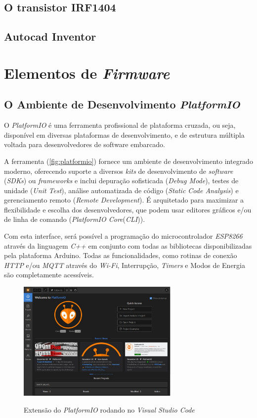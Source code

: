 \subsection{O transistor IRF1404} 
\subsection{Autocad Inventor}

\section{Elementos de \textit{Firmware}}

\subsection{O Ambiente de Desenvolvimento \textit{PlatformIO}}


O \textit{PlatformIO} é uma ferramenta profissional de plataforma cruzada, ou seja, disponível em diversas plataformas de desenvolvimento, e de estrutura múltipla voltada para desenvolvedores de software embarcado.

A ferramenta (\autoref{fig:platformio}) fornece um ambiente de desenvolvimento integrado moderno, oferecendo suporte a diversos \textit{kits} de desenvolvimento de \textit{software} (\textit{SDKs}) ou \textit{frameworks} e inclui depuração sofisticada (\textit{Debug Mode}), testes de unidade (\textit{Unit Test}), análise automatizada de código (\textit{Static Code Analysis}) e gerenciamento remoto (\textit{Remote Development}). É arquitetado para maximizar a flexibilidade e escolha dos desenvolvedores, que podem usar editores gráficos e/ou de linha de comando (\textit{PlatformIO Core}(\textit{CLI})).

Com esta interface, será possível a programação do microcontrolador \textit{ESP8266} através da linguagem \textit{C++} em conjunto com todas as bibliotecas disponibilizadas pela plataforma Arduino. Todas as funcionalidades, como rotinas de conexão \textit{HTTP} e/ou \textit{MQTT} através do \textit{Wi-Fi}, Interrupção, \textit{Timers} e Modos de Energia são completamente acessíveis. 

\begin{figure}[H]
	\centering
	\caption{Extensão do \textit{PlatformIO} rodando no \textit{Visual Studio Code}}
	\includegraphics[width=0.7\textwidth]{figuras/platformio.jpg}
	\label{fig:platformio}
	
\end{figure}


